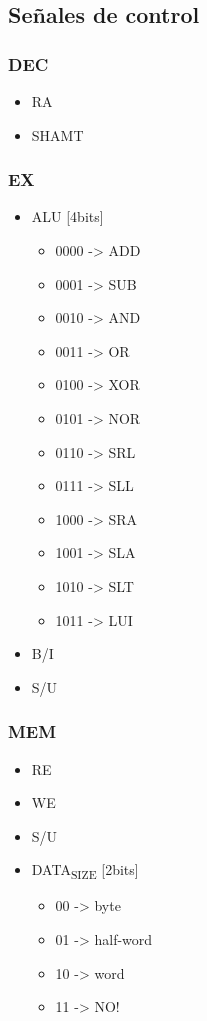 \documentclass[11pt]{article}
\begin{document}
\subsection{Señales de control}
\label{sec:org550633a}

\subsubsection{DEC}
\label{sec:org8cb6506}
\begin{itemize}
\item RA
\item SHAMT
\end{itemize}

\subsubsection{EX}
\label{sec:org737023a}

\begin{itemize}
\item ALU [4bits]                                                                                                                                                                   
\begin{itemize}
\item 0000 -> ADD
\item 0001 -> SUB
\item 0010 -> AND
\item 0011 -> OR
\item 0100 -> XOR
\item 0101 -> NOR
\item 0110 -> SRL
\item 0111 -> SLL
\item 1000 -> SRA
\item 1001 -> SLA
\item 1010 -> SLT
\item 1011 -> LUI
\end{itemize}
\item B/I
\item S/U
\end{itemize}

\subsubsection{MEM}
\label{sec:orgae442cc}

\begin{itemize}
\item RE
\item WE
\item S/U
\item DATA\textsubscript{SIZE} [2bits]
\begin{itemize}
\item 00 -> byte
\item 01 -> half-word
\item 10 -> word
\item 11 -> NO!
\end{itemize}
\end{itemize}
\end{document}
